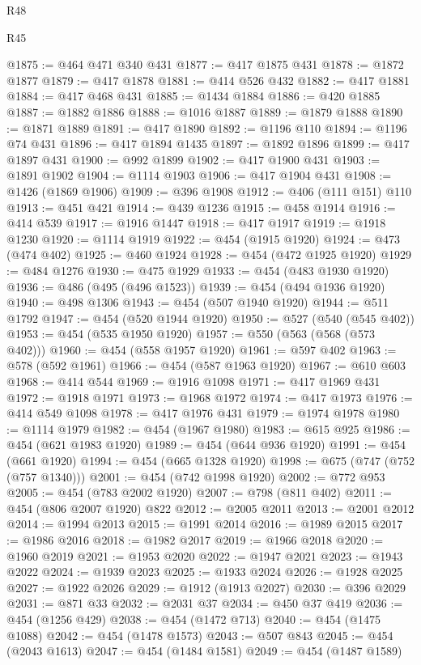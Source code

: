 \begin{lexlean}{R48}
\begin{lexlean}{R45}
\begin{coremodule}
{{{{{{{{{{{{{{{{{{{{{{{{{{{{{{{{{{{{{{{{{{{{{{{{{{{{{{{{{{{{{{{{{{{{{{{{{{{{{{{{{{{{{{{{{{{@1875 := @464 @471 @340 @431
@1877 := @417 @1875 @431
@1878 := @1872 @1877
@1879 := @417 @1878
@1881 := @414 @526 @432
@1882 := @417 @1881
@1884 := @417 @468 @431
@1885 := @1434 @1884
@1886 := @420 @1885
@1887 := @1882 @1886
@1888 := @1016 @1887
@1889 := @1879 @1888
@1890 := @1871 @1889
@1891 := @417 @1890
@1892 := @1196 @110
@1894 := @1196 @74 @431
@1896 := @417 @1894 @1435
@1897 := @1892 @1896
@1899 := @417 @1897 @431
@1900 := @992 @1899
@1902 := @417 @1900 @431
@1903 := @1891 @1902
@1904 := @1114 @1903
@1906 := @417 @1904 @431
@1908 := @1426 (@1869 @1906)
@1909 := @396 @1908
@1912 := @406 (@111 @151) @110
@1913 := @451 @421
@1914 := @439 @1236
@1915 := @458 @1914
@1916 := @414 @539
@1917 := @1916 @1447
@1918 := @417 @1917
@1919 := @1918 @1230
@1920 := @1114 @1919
@1922 := @454 (@1915 @1920)
@1924 := @473 (@474 @402)
@1925 := @460 @1924
@1928 := @454 (@472 @1925 @1920)
@1929 := @484 @1276
@1930 := @475 @1929
@1933 := @454 (@483 @1930 @1920)
@1936 := @486 (@495 (@496 @1523))
@1939 := @454 (@494 @1936 @1920)
@1940 := @498 @1306
@1943 := @454 (@507 @1940 @1920)
@1944 := @511 @1792
@1947 := @454 (@520 @1944 @1920)
@1950 := @527 (@540 (@545 @402))
@1953 := @454 (@535 @1950 @1920)
@1957 := @550 (@563 (@568 (@573 @402)))
@1960 := @454 (@558 @1957 @1920)
@1961 := @597 @402
@1963 := @578 (@592 @1961)
@1966 := @454 (@587 @1963 @1920)
@1967 := @610 @603
@1968 := @414 @544
@1969 := @1916 @1098
@1971 := @417 @1969 @431
@1972 := @1918 @1971
@1973 := @1968 @1972
@1974 := @417 @1973
@1976 := @414 @549 @1098
@1978 := @417 @1976 @431
@1979 := @1974 @1978
@1980 := @1114 @1979
@1982 := @454 (@1967 @1980)
@1983 := @615 @925
@1986 := @454 (@621 @1983 @1920)
@1989 := @454 (@644 @936 @1920)
@1991 := @454 (@661 @1920)
@1994 := @454 (@665 @1328 @1920)
@1998 := @675 (@747 (@752 (@757 @1340)))
@2001 := @454 (@742 @1998 @1920)
@2002 := @772 @953
@2005 := @454 (@783 @2002 @1920)
@2007 := @798 (@811 @402)
@2011 := @454 (@806 @2007 @1920) @822
@2012 := @2005 @2011
@2013 := @2001 @2012
@2014 := @1994 @2013
@2015 := @1991 @2014
@2016 := @1989 @2015
@2017 := @1986 @2016
@2018 := @1982 @2017
@2019 := @1966 @2018
@2020 := @1960 @2019
@2021 := @1953 @2020
@2022 := @1947 @2021
@2023 := @1943 @2022
@2024 := @1939 @2023
@2025 := @1933 @2024
@2026 := @1928 @2025
@2027 := @1922 @2026
@2029 := @1912 (@1913 @2027)
@2030 := @396 @2029
@2031 := @871 @33
@2032 := @2031 @37
@2034 := @450 @37 @419
@2036 := @454 (@1256 @429)
@2038 := @454 (@1472 @713)
@2040 := @454 (@1475 @1088)
@2042 := @454 (@1478 @1573)
@2043 := @507 @843
@2045 := @454 (@2043 @1613)
@2047 := @454 (@1484 @1581)
@2049 := @454 (@1487 @1589)
}}}}}}}}}}}}}}}}}}}}}}}}}}}}}}}}}}}}}}}}}}}}}}}}}}}}}}}}}}}}}}}}}}}}}}}}}}}}}}}}}}}}}}}}}}}
\end{coremodule}
\end{lexlean}
\end{lexlean}
